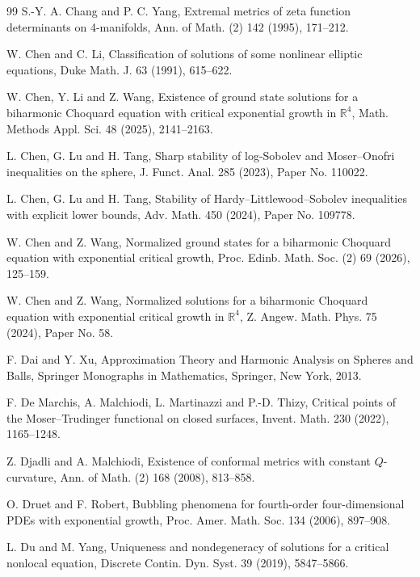 \documentclass[11pt]{article}
\numberwithin{equation}{section}
\begin{document}
\begin{thebibliography}{99}
S.-Y. A. Chang and P. C. Yang,
Extremal metrics of zeta function determinants on 4-manifolds,
Ann. of Math. (2) 142 (1995), 171--212.

W. Chen and C. Li,
Classification of solutions of some nonlinear elliptic equations,
Duke Math. J. 63 (1991), 615--622.

W. Chen, Y. Li and Z. Wang,
Existence of ground state solutions for a biharmonic Choquard equation with critical exponential growth in \(\mathbb R^{4}\),
Math. Methods Appl. Sci. 48 (2025), 2141--2163.

L. Chen, G. Lu and H. Tang,
Sharp stability of log-Sobolev and Moser--Onofri inequalities on the sphere,
J. Funct. Anal. 285 (2023), Paper No. 110022.

L. Chen, G. Lu and H. Tang,
Stability of Hardy--Littlewood--Sobolev inequalities with explicit lower bounds,
Adv. Math. 450 (2024), Paper No. 109778.

W. Chen and Z. Wang,
Normalized ground states for a biharmonic Choquard equation with exponential critical growth,
Proc. Edinb. Math. Soc. (2) 69 (2026), 125--159.

W. Chen and Z. Wang,
Normalized solutions for a biharmonic Choquard equation with exponential critical growth in \(\mathbb R^{4}\),
Z. Angew. Math. Phys. 75 (2024), Paper No. 58.

F. Dai and Y. Xu,
Approximation Theory and Harmonic Analysis on Spheres and Balls,
Springer Monographs in Mathematics, Springer, New York, 2013.

F. De Marchis, A. Malchiodi, L. Martinazzi and P.-D. Thizy,
Critical points of the Moser--Trudinger functional on closed surfaces,
Invent. Math. 230 (2022), 1165--1248.

Z. Djadli and A. Malchiodi,
Existence of conformal metrics with constant \(Q\)-curvature,
Ann. of Math. (2) 168 (2008), 813--858.

O. Druet and F. Robert,
Bubbling phenomena for fourth-order four-dimensional PDEs with exponential growth,
Proc. Amer. Math. Soc. 134 (2006), 897--908.

L. Du and M. Yang,
Uniqueness and nondegeneracy of solutions for a critical nonlocal equation,
Discrete Contin. Dyn. Syst. 39 (2019), 5847--5866.


\end{thebibliography}
\end{document}
